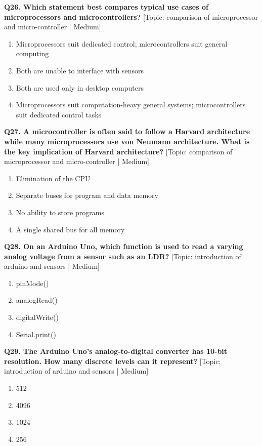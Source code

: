 \noindent\textbf{Q26. Which statement best compares typical use cases of microprocessors and microcontrollers?} \hfill [Topic: comparison of microprocessor and micro-controller | Medium]
\begin{enumerate}[label=(\alph*),topsep=2pt,itemsep=1pt,partopsep=0pt,parsep=0pt]
    \item {Microprocessors suit dedicated control; microcontrollers suit general computing}
    \item {Both are unable to interface with sensors}
    \item {Both are used only in desktop computers}
    \item {Microprocessors suit computation-heavy general systems; microcontrollers suit dedicated control tasks}
\end{enumerate}
\vspace{2mm}

\noindent\textbf{Q27. A microcontroller is often said to follow a Harvard architecture while many microprocessors use von Neumann architecture. What is the key implication of Harvard architecture?} \hfill [Topic: comparison of microprocessor and micro-controller | Medium]
\begin{enumerate}[label=(\alph*),topsep=2pt,itemsep=1pt,partopsep=0pt,parsep=0pt]
    \item {Elimination of the CPU}
    \item {Separate buses for program and data memory}
    \item {No ability to store programs}
    \item {A single shared bus for all memory}
\end{enumerate}
\vspace{2mm}

\noindent\textbf{Q28. On an Arduino Uno, which function is used to read a varying analog voltage from a sensor such as an LDR?} \hfill [Topic: introduction of arduino and sensors | Medium]
\begin{enumerate}[label=(\alph*),topsep=2pt,itemsep=1pt,partopsep=0pt,parsep=0pt]
    \item {pinMode()}
    \item {analogRead()}
    \item {digitalWrite()}
    \item {Serial.print()}
\end{enumerate}
\vspace{2mm}

\noindent\textbf{Q29. The Arduino Uno's analog-to-digital converter has 10-bit resolution. How many discrete levels can it represent?} \hfill [Topic: introduction of arduino and sensors | Medium]
\begin{enumerate}[label=(\alph*),topsep=2pt,itemsep=1pt,partopsep=0pt,parsep=0pt]
    \item {512}
    \item {4096}
    \item {1024}
    \item {256}
\end{enumerate}
\vspace{2mm}

